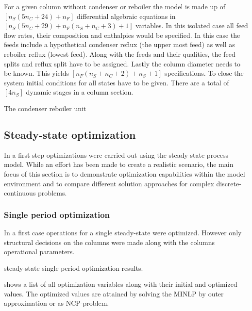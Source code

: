    For a given column without condenser or reboiler the model is made up of $[n_S (5n_C + 24) + n_F]$
    differential algebraic equations in $[n_S (5n_C + 29) + n_F (n_S + n_C + 3) + 1]$ variables. In this
    isolated case all feed flow rates, their composition and enthalpies would be specified. In this case
    the feeds include a hypothetical condenser reflux (the upper most feed) as well as reboiler reflux
    (lowest feed). Along with the feeds and their qualities, the feed splits and reflux split have to be
    assigned. Lastly the column diameter needs to be known. This yields $[n_F (n_S + n_C + 2) + n_S + 1]$
    specifications. To close the system initial conditions for all states have to be given. There
    are a total of $[4 n_S ]$ dynamic stages in a column section.

    The condenser reboiler unit

    \subsection{Steady-state optimization}
    In a first step optimizations were carried out using the steady-state process model. While an effort
    has been made to create a realistic scenario, the main focus of this section is to demonstrate
    optimization capabilities within the model environment \gproms and to compare different solution
    approaches for complex discrete-continuous problems.

    \subsubsection{Single period optimization}
    In a first case operations for a single steady-state were optimized. However only structural decisions
    on the columns were made along with the columns operational parameters.
    \begin{table}
        \center
        \footnotesize
        
        \label{tab:ss1_results}
        \caption{steady-state single period optimization results.}
    \end{table}
     shows a list of all optimization variables along with their initial and optimized values.
    The optimized values are attained by solving the MINLP by outer approximation or as NCP-problem.
    
